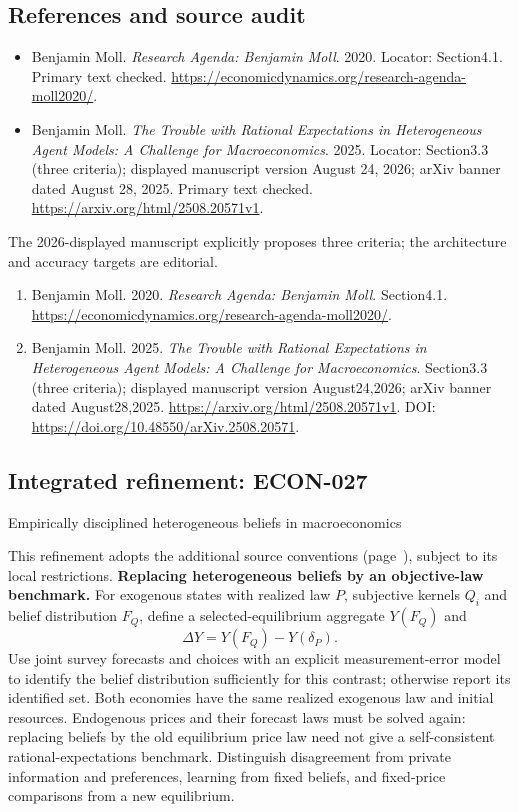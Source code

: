 \documentclass[11pt,a4paper]{article}
\begin{document}
\subsection*{References and source audit}
\begin{itemize}
\item Benjamin Moll. \emph{Research Agenda: Benjamin Moll}. 2020. Locator: Section4.1. Primary text checked. \url{https://economicdynamics.org/research-agenda-moll2020/}.
\item Benjamin Moll. \emph{The Trouble with Rational Expectations in Heterogeneous Agent Models: A Challenge for Macroeconomics}. 2025. Locator: Section3.3 (three criteria); displayed manuscript version August 24, 2026; arXiv banner dated August 28, 2025. Primary text checked. \url{https://arxiv.org/html/2508.20571v1}.
\end{itemize}
The 2026-displayed manuscript explicitly proposes three criteria; the architecture and accuracy targets are editorial.
\begin{enumerate}\raggedright
\item\hypertarget{definitions:source:30007514:1}{} Benjamin Moll. 2020. \emph{Research Agenda: Benjamin Moll}. Section4.1.
\url{https://economicdynamics.org/research-agenda-moll2020/}.
\item\hypertarget{definitions:source:30007514:2}{} Benjamin Moll. 2025. \emph{The Trouble with Rational Expectations in Heterogeneous Agent Models: A Challenge for Macroeconomics}. Section3.3 (three criteria); displayed manuscript version August24,2026; arXiv banner dated August28,2025.
\url{https://arxiv.org/html/2508.20571v1}.
DOI: \url{https://doi.org/10.48550/arXiv.2508.20571}.
\end{enumerate}

\subsection*{Integrated refinement: ECON-027}
{\sffamily\small\color{muted}Empirically disciplined heterogeneous beliefs in macroeconomics\par}
This refinement adopts the additional source conventions
(page~\pageref{audited:conventions}), subject to its local restrictions.
\textbf{Replacing heterogeneous beliefs by an objective-law benchmark.}
For exogenous states with realized law $P$, subjective kernels $Q_i$ and belief
distribution $F_Q$, define a selected-equilibrium aggregate $Y(F_Q)$ and
\[
\Delta Y=Y(F_Q)-Y(\delta_P).
\]
Use joint survey forecasts and choices with an explicit measurement-error model
to identify the belief distribution sufficiently for this contrast; otherwise
report its identified set. Both economies have the same realized exogenous law
and initial resources. Endogenous prices and their forecast laws must be solved
again: replacing beliefs by the old equilibrium price law need not give a
self-consistent rational-expectations benchmark. Distinguish disagreement from
private information and preferences, learning from fixed beliefs, and
fixed-price comparisons from a new equilibrium.
\end{document}
